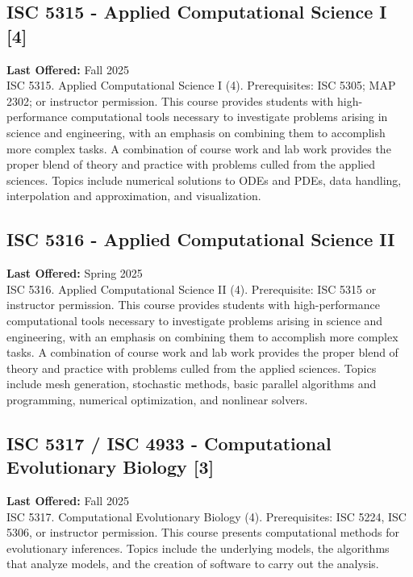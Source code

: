 \documentclass[12pt,a4paper]{article}
\begin{document}
\subsection{ISC 5315 - Applied Computational Science I [4]}
\textbf{Last Offered:} Fall 2025 \\
ISC 5315. Applied Computational Science I (4). Prerequisites: ISC 5305; MAP 2302; or instructor permission. This course provides students with high-performance computational tools necessary to investigate problems arising in science and engineering, with an emphasis on combining them to accomplish more complex tasks. A combination of course work and lab work provides the proper blend of theory and practice with problems culled from the applied sciences. Topics include numerical solutions to ODEs and PDEs, data handling, interpolation and approximation, and visualization.

\subsection{ISC 5316 - Applied Computational Science II}
\textbf{Last Offered:} Spring 2025 \\
ISC 5316. Applied Computational Science II (4). Prerequisite: ISC 5315 or instructor permission. This course provides students with high-performance computational tools necessary to investigate problems arising in science and engineering, with an emphasis on combining them to accomplish more complex tasks. A combination of course work and lab work provides the proper blend of theory and practice with problems culled from the applied sciences. Topics include mesh generation, stochastic methods, basic parallel algorithms and programming, numerical optimization, and nonlinear solvers.

\subsection{ISC 5317 / ISC 4933 - Computational Evolutionary Biology [3]}
\textbf{Last Offered:} Fall 2025 \\
ISC 5317. Computational Evolutionary Biology (4). Prerequisites: ISC 5224, ISC 5306, or instructor permission. This course presents computational methods for evolutionary inferences. Topics include the underlying models, the algorithms that analyze models, and the creation of software to carry out the analysis.
\end{document}
